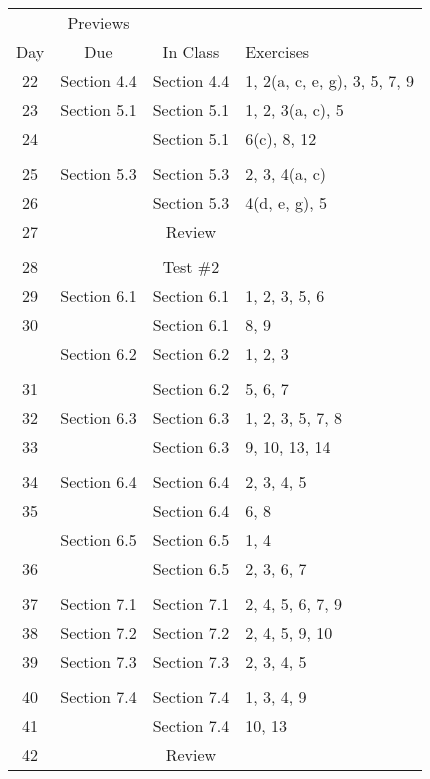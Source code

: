 \begin{center}
\begin{tabular}[h]{| c | c | c | l |} \hline
     &  Previews &            &            \\
 Day &  Due      &  In Class  &  Exercises \\  \hline
 22  &  Section 4.4  &  Section 4.4  &  1, 2(a, c, e, g), 3, 5, 7, 9 \\ \hline
 23  &  Section 5.1  &  Section 5.1  &  1, 2, 3(a, c), 5 \\ \hline
 24  &               &  Section 5.1  &  6(c), 8, 12 \\ \hline
     &               &               &  \\ \hline
 25  &  Section 5.3  &  Section 5.3  &  2, 3, 4(a, c) \\ \hline
 26  &               &  Section 5.3  &  4(d, e, g), 5 \\ \hline
 27  &               &  Review       &  \\ \hline
     &               &               &  \\ \hline
 28  &               &  Test \#2     &  \\ \hline
 29  &  Section 6.1  &  Section 6.1  &  1, 2, 3, 5, 6  \\ \hline
 30  &               &  Section 6.1  &  8, 9  \\
     &  Section 6.2  &  Section 6.2  &  1, 2, 3  \\ \hline
     &               &               &  \\ \hline
 31  &               &  Section 6.2  &  5, 6, 7  \\ \hline
 32  &  Section 6.3  &  Section 6.3  &  1, 2, 3, 5, 7, 8  \\ \hline
 33  &               &  Section 6.3  &  9, 10, 13, 14  \\ \hline
     &               &               &  \\ \hline
 34  &  Section 6.4  &  Section 6.4  &  2, 3, 4, 5  \\ \hline
 35  &               &  Section 6.4  &  6, 8 \\
     &  Section 6.5  &  Section 6.5  &  1, 4  \\ \hline
 36  &               &  Section 6.5  &  2, 3, 6, 7  \\ \hline
     &               &               &  \\ \hline
 37  &  Section 7.1  &  Section 7.1  &   2, 4, 5, 6, 7, 9  \\ \hline
 38  &  Section 7.2  &  Section 7.2  &  2, 4, 5, 9, 10  \\ \hline
 39  &  Section 7.3  &  Section 7.3  &  2, 3, 4, 5  \\ \hline
     &               &               &  \\ \hline
 40  &  Section 7.4  &  Section 7.4  &  1, 3, 4, 9  \\ \hline
 41  &               &  Section 7.4  &  10, 13  \\ \hline
 42  &               &  Review       &  \\ \hline
\end{tabular}
\end{center}
\hbreak
\newpage

